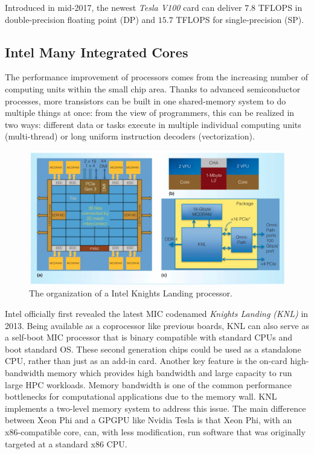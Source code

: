 Introduced in mid-2017, the newest \textit{Tesla V100} card can deliver $7.8$ TFLOPS in double-precision floating point (DP) and $15.7$ TFLOPS for single-precision (SP).

\subsection{Intel Many Integrated Cores}

The performance improvement of processors comes from the increasing number of computing units within the small chip area. Thanks to advanced semiconductor processes, more transistors can be built in one shared-memory system to do multiple things at once: from the view of programmers, this can be realized in two ways: different data or tasks execute in multiple individual computing units (multi-thread) or long uniform instruction decoders (vectorization).

\begin{figure}[htbp]
	\centering
	\includegraphics[width=0.99\linewidth]{fig/KNL1.png}
	\caption{The organization of a Intel Knights Landing processor.}
	\label{knl1}
\end{figure}

Intel officially first revealed the latest MIC codenamed \textit{Knights Landing (KNL)} in 2013. Being available as a coprocessor like previous boards, KNL can also serve as a self-boot MIC processor that is binary compatible with standard CPUs and boot standard OS. These second generation chips could be used as a standalone CPU, rather than just as an add-in card. Another key feature is the on-card high-bandwidth memory which provides high bandwidth and large capacity to run large HPC workloads. Memory bandwidth is one of the common performance bottlenecks for computational applications due to the memory wall. KNL implements a two-level memory system to address this issue. The main difference between Xeon Phi and a GPGPU like Nvidia Tesla is that Xeon Phi, with an x86-compatible core, can, with less modification, run software that was originally targeted at a standard x86 CPU.

